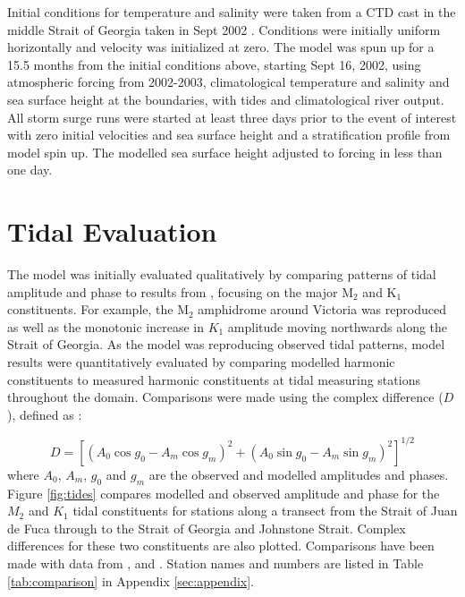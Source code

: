 \documentclass{tATO2e}
\begin{document}
Initial conditions for temperature and salinity were taken from a CTD cast in the middle Strait of Georgia taken in Sept 2002 \citep{pawlowiczetal2007}. Conditions were initially uniform horizontally and velocity was initialized at zero. The model was spun up for a 15.5 months from the initial conditions above, starting Sept 16, 2002, using atmospheric forcing from 2002-2003, climatological temperature and salinity and sea surface height at the boundaries, with tides and climatological river output.  All storm surge runs were started at least three days prior to the event of interest with zero initial velocities and sea surface height and a stratification profile from model spin up. The modelled sea surface height adjusted to forcing in less than one day. 

\section{Tidal Evaluation}\label{sec:model}

The model was initially evaluated qualitatively by comparing patterns of tidal amplitude and phase to results from \citet{foreman1995tidal}, focusing on the major M$_2$ and K$_1$ constituents. For example, the M$_2$ amphidrome around Victoria was reproduced as well as the monotonic increase in $K_1$ amplitude moving northwards along the Strait of Georgia. As the model was reproducing observed tidal patterns, model results were quantitatively evaluated by comparing modelled harmonic constituents to measured harmonic constituents at tidal measuring stations throughout the domain. Comparisons were made using the complex difference ($D$), defined as \citep{foreman1995tidal}:

\begin{equation}
D = [(A_0 \cos g_0 - A_m \cos g_m)^2 + (A_0 \sin g_0 - A_m \sin g_m)^2]^{1/2}
\end{equation}\label{eq:compdiff}
where $A_0$, $A_m$, $g_0$ and $g_m$ are the observed and modelled amplitudes and phases. Figure \ref{fig:tides} compares modelled and observed amplitude and phase for the $M_2$ and $K_1$ tidal constituents for stations along a transect from the Strait of Juan de Fuca through to the Strait of Georgia and Johnstone Strait. Complex differences for these two constituents are also plotted.  Comparisons have been made with data from \citet{foreman1995tidal}, \citet{foreman2004m} and \citet{foreman2012circulation}. Station names and numbers are listed in Table  \ref{tab:comparison} in Appendix \ref{sec:appendix}.
\end{document}
